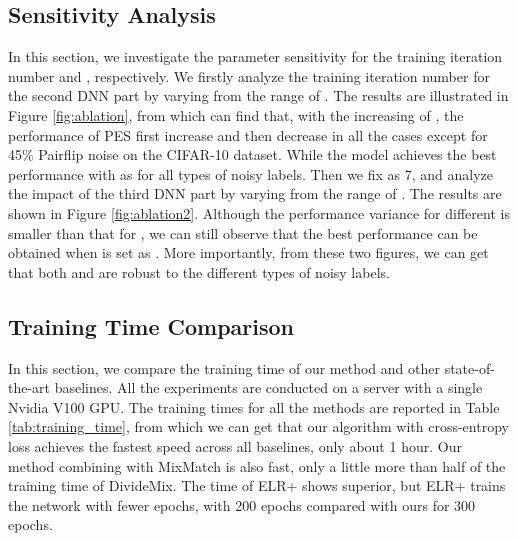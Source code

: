 \documentclass[11pt]{article}
\begin{document}
\subsection{Sensitivity Analysis}
\label{sec:abl}
In this section, we investigate the parameter sensitivity for the training iteration number  and , respectively. We firstly analyze the training iteration number for the second DNN part by varying  from the range of . The results are illustrated in Figure \ref{fig:ablation}, from which can find that, with the increasing of , the performance of PES first increase and then decrease in all the cases except for 45\% Pairflip noise on the CIFAR-10 dataset. While the model achieves the best performance with  as  for all types of noisy labels.  Then we fix  as 7, and analyze the impact of  the third DNN part by varying  from the range of . The results are shown in Figure \ref{fig:ablation2}. Although the performance variance for different  is smaller than that for , we can still observe that the best performance can be obtained when  is set as . More importantly, from these two figures, we can get that both  and  are robust to the different types of noisy labels. 




\subsection{Training Time Comparison}
\label{subsec:time}
In this section, we compare the training time of our method and other state-of-the-art baselines. All the experiments are conducted on a server with a single Nvidia V100 GPU. The training times for all the methods are reported in Table \ref{tab:training_time}, from which we can get that our algorithm with cross-entropy loss achieves the fastest speed across all baselines, only about 1 hour. Our method combining with MixMatch \cite{Berthelot2019MixMatch} is also fast, only a little more than half of the training time of DivideMix. The time of ELR+ \cite{Liu2020ELR} shows superior, but ELR+ trains the network with fewer epochs, with 200 epochs compared with ours for 300 epochs. 



\begin{table}[!tp]
\fontsize{8.5}{10}\selectfont
\centering
\caption{Training time comparison for baselines on CIFAR-10 with 50\% Symmetric label noise.}
\label{tab:training_time}
\vspace{5pt}
\vspace{-10pt}
\end{table}
\end{document}
